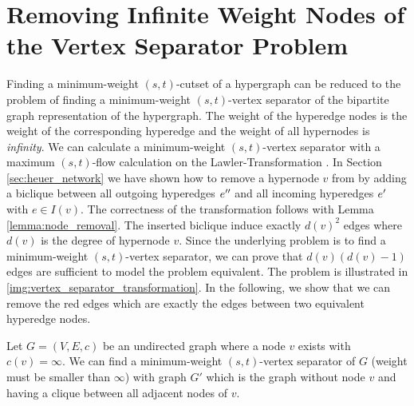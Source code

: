 \newpage
\section{Removing Infinite Weight Nodes of the Vertex Separator Problem}
\label{sec:infinite_weight_vertex_separator}

Finding a minimum-weight $(s,t)$-cutset of a hypergraph can be reduced to the problem 
of finding a minimum-weight $(s,t)$-vertex separator of the bipartite graph representation
of the hypergraph. The weight of the hyperedge nodes is the weight of the corresponding
hyperedge and the weight of all hypernodes is \emph{infinity}. We can calculate
a minimum-weight $(s,t)$-vertex separator with a maximum $(s,t)$-flow calculation 
on the Lawler-Transformation . In Section \ref{sec:heuer_network} 
we have shown how to remove a hypernode $v$ from  by adding a 
biclique between all outgoing hyperedges $e''$ and all
incoming hyperedges $e'$ with $e \in I(v)$. The correctness of the transformation
follows with Lemma \ref{lemma:node_removal}. The inserted biclique induce exactly
$d(v)^2$ edges where $d(v)$ is the degree of hypernode $v$. Since the underlying problem
is to find a minimum-weight $(s,t)$-vertex separator, we can prove that $d(v)(d(v)-1)$ edges
are sufficient to model the problem equivalent. The problem is illustrated in \autoref{img:vertex_separator_transformation}.
In the following, we show that we can remove the red edges which are exactly the edges between
two equivalent hyperedge nodes. 

\begin{lemma}
\label{lemma:vertex_separator_lemma}
Let $G = (V,E,c)$ be an undirected graph where a node $v$ exists with $c(v) = \infty$.
We can find a minimum-weight $(s,t)$-vertex separator of $G$ (weight must be smaller than 
$\infty$) with graph $G'$ which is the graph without node $v$ and having a clique 
between all adjacent nodes of $v$.
\end{lemma}


